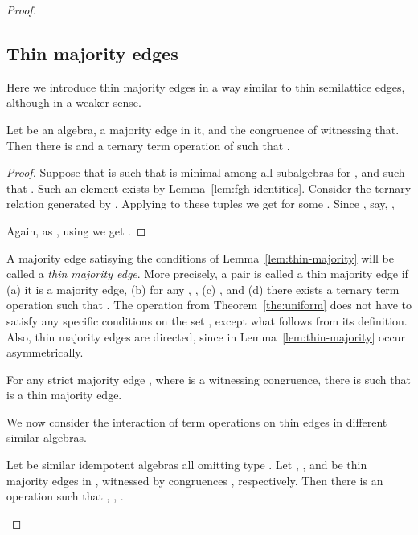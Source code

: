 \documentclass[11pt]{article}
\begin{document}
\begin{proof}
\subsection{Thin majority edges}\label{sec:thin-majority}

Here we introduce thin majority edges in a way similar to thin semilattice edges,
although in a weaker sense.

\begin{lemma}\label{lem:thin-majority}
Let  be an algebra,  a majority edge in it, and  the congruence of 
 witnessing that. Then there is  and a ternary term operation 
 of  such that .
\end{lemma}

\begin{proof}
Suppose that  is such that  is minimal among all subalgebras  
for , and such that . Such an element exists by 
Lemma~\ref{lem:fgh-identities}. Consider the ternary relation  
generated by . Applying  to these tuples we get 
 for some . Since , say, , 

Again, as , using  we get .
\end{proof}

A majority edge satisying the conditions of Lemma~\ref{lem:thin-majority} will be
called a \emph{thin majority edge}. More precisely, a pair  is called a thin 
majority edge if (a) it is a majority edge, (b) for any , 
, (c) , and (d) there exists a ternary term operation 
 such that .  The operation  from 
Theorem~\ref{the:uniform} does not have to satisfy any specific conditions on 
the set , except what follows from its definition. Also, thin majority edges
are directed, since  in Lemma~\ref{lem:thin-majority} occur asymmetrically.

\begin{corollary}\label{cor:thin-majority}
For any strict majority edge , where  is a witnessing congruence, there is 
 such that  is a thin majority edge.
\end{corollary}

We now consider the interaction of term operations on thin edges in different 
similar algebras.

\begin{lemma}\label{lem:thin-majority-triple}
Let  be similar idempotent algebras all omitting type \one.
Let , , and  be thin majority edges in , 
witnessed by congruences , respectively. Then there is an operation 
 such that , , .
\end{lemma}


\end{proof}
\end{document}
